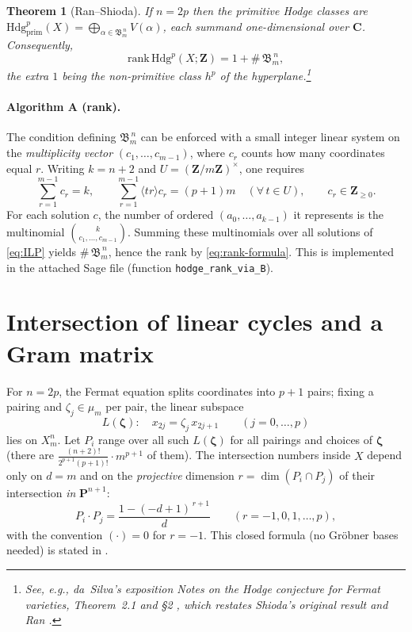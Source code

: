 \documentclass[11pt]{article}
\newtheorem{theorem}{Theorem}
\theoremstyle{definition}
\newcommand{\Xmn}{X_m^n}
\newcommand{\PP}{\mathbf{P}}
\newcommand{\ZZ}{\mathbf{Z}}
\newcommand{\CC}{\mathbf{C}}
\newcommand{\Hdg}{\mathrm{Hdg}}
\newcommand{\rank}{\mathrm{rank}}
\begin{document}
\begin{theorem}[Ran--Shioda]
If \(n=2p\) then the primitive Hodge classes are
\(\Hdg^p_{\mathrm{prim}}(X)=\bigoplus_{\alpha\in \mathfrak B_m^{\,n}} V(\alpha)\), each summand one-dimensional over \(\CC\). Consequently,
\begin{equation}\label{eq:rank-formula}
\rank\,\Hdg^p(X;\ZZ)=1+\#\,\mathfrak B_m^{\,n},
\end{equation}
the extra \(1\) being the non-primitive class \(h^p\) of the hyperplane.\footnote{See, e.g., da~Silva's exposition \emph{Notes on the Hodge conjecture for Fermat varieties}, Theorem~2.1 and \S2 \cite{daSilva2021}, which restates Shioda's original result \cite{Shioda1979} and Ran \cite{Ran1980}.}
\end{theorem}

\paragraph{Algorithm A (rank).} The condition defining \(\mathfrak B_m^{\,n}\) can be enforced with a small integer linear system on the \emph{multiplicity vector} \((c_1,\dots,c_{m-1})\), where \(c_r\) counts how many coordinates equal \(r\). Writing \(k=n+2\) and \(U=(\ZZ/m\ZZ)^\times\), one requires
\begin{equation}\label{eq:ILP}
\sum_{r=1}^{m-1} c_r = k,\qquad \sum_{r=1}^{m-1}\big\langle t r\big\rangle c_r = (p+1)m\quad(\forall\,t\in U),\qquad c_r\in\ZZ_{\ge 0}.
\end{equation}
For each solution \(c\), the number of ordered \((a_0,\dots,a_{k-1})\) it represents is the multinomial \(\binom{k}{c_1,\dots,c_{m-1}}\). Summing these multinomials over all solutions of \eqref{eq:ILP} yields \(\#\,\mathfrak B_m^{\,n}\), hence the rank by \eqref{eq:rank-formula}. This is implemented in the attached \textsf{Sage} file (function \texttt{hodge\_rank\_via\_B}).

\medskip
\section{Intersection of linear cycles and a Gram matrix}
For \(n=2p\), the Fermat equation splits coordinates into \(p+1\) pairs; fixing a pairing and \(\zeta_j\in\mu_m\) per pair, the linear subspace
\begin{equation}\label{eq:linear-cycle}
L(\boldsymbol\zeta):\quad x_{2j}=\zeta_j\,x_{2j+1}\qquad (j=0,\dots,p)
\end{equation}
lies on \(\Xmn\). Let \(P_i\) range over all such \(L(\boldsymbol\zeta)\) for all pairings and choices of \(\boldsymbol\zeta\) (there are \( \frac{(n+2)!}{2^{p+1}(p+1)!}\cdot m^{p+1}\) of them). The intersection numbers inside \(X\) depend only on \(d=m\) and on the \emph{projective} dimension \(r=\dim(P_i\cap P_j)\) of their intersection \emph{in} \(\PP^{n+1}\):
\begin{equation}\label{eq:AMV-formula}
P_i\cdot P_j=\frac{1-(-d+1)^{\,r+1}}{d}\qquad(r=-1,0,1,\dots,p),
\end{equation}
with the convention \((\cdot)=0\) for $r=-1$. This closed formula (no Gr\"obner bases needed) is stated in \cite[Eq.\,(6)]{AMV2019}.
\end{document}
